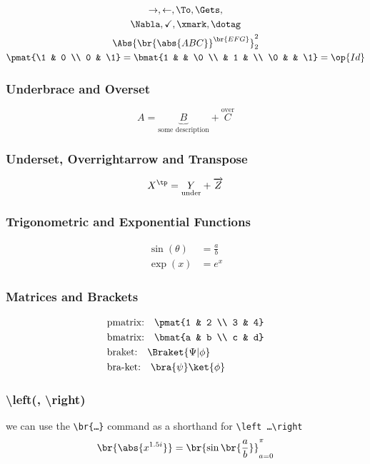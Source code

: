     \begin{gather*}
        \to, \gets, \To, \Gets,\\
        \Nabla, \checkmark, \xmark,  \dotag \\
        \Abs{\br{\abs{ABC}}^{\br{EFG}}}^2_2\\
        \pmat{\1 & 0 \\ 0 & \1} = 
        \bmat{1 &  & \0 \\  & 1 &  \\ \0 &  &  \1} =
        \op{Id}
    \end{gather*}

\subsubsection{Underbrace and Overset}
\[
    A = \underbrace{B}_{\text{some description}} + \overset{\text{over}}{C}
\]

\subsubsection{Underset, Overrightarrow and Transpose}
\[
    X^\tp = \underset{\text{under}}{Y} + \overrightarrow{Z}
\]

\subsubsection{Trigonometric and Exponential Functions}
    \begin{align*}
        \sin(\theta) &= \frac{a}{b} \\
        \exp(x) &= e^x
    \end{align*}

\subsubsection{Matrices and Brackets}
    \begin{align*}
        &\text{pmatrix:} \quad \pmat{1 & 2 \\ 3 & 4} \\
        &\text{bmatrix:} \quad \bmat{a & b \\ c & d} \\
        &\text{braket:} \quad \Braket{\Psi | \phi} \\
        &\text{bra-ket:} \quad \bra{\psi} \ket{\phi}
    \end{align*}

\subsubsection{\textbackslash{left(}, \textbackslash{right)}}
we can use the \texttt{\textbackslash br\{\dots\}} command as a shorthand for \texttt{\textbackslash left \dots \textbackslash right}
\[
    \br{\abs{x^{1.5i}}} = \br{\sin\br{\frac{a}{b}}}_{a=0}^{\pi}
\]

